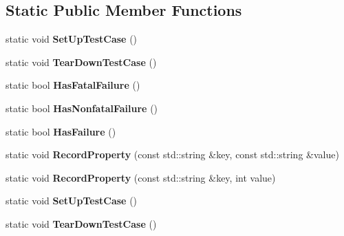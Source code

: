 \subsection*{Static Public Member Functions}
\begin{DoxyCompactItemize}
\item 
\hypertarget{classtesting_1_1_test_a5ccbac42fee8c5b00b0bfe89b6c49d79}{}static void {\bfseries Set\+Up\+Test\+Case} ()\label{classtesting_1_1_test_a5ccbac42fee8c5b00b0bfe89b6c49d79}

\item 
\hypertarget{classtesting_1_1_test_af374706cbaf0ffc460f4fd04e7c150f1}{}static void {\bfseries Tear\+Down\+Test\+Case} ()\label{classtesting_1_1_test_af374706cbaf0ffc460f4fd04e7c150f1}

\item 
\hypertarget{classtesting_1_1_test_a0a89846458f0e8ed1c9457c957e8182a}{}static bool {\bfseries Has\+Fatal\+Failure} ()\label{classtesting_1_1_test_a0a89846458f0e8ed1c9457c957e8182a}

\item 
\hypertarget{classtesting_1_1_test_a07e896f1b1836f8ac075c26d7b7c9fb8}{}static bool {\bfseries Has\+Nonfatal\+Failure} ()\label{classtesting_1_1_test_a07e896f1b1836f8ac075c26d7b7c9fb8}

\item 
\hypertarget{classtesting_1_1_test_a7a00be7dd0a6bfdc8d47a1b784623613}{}static bool {\bfseries Has\+Failure} ()\label{classtesting_1_1_test_a7a00be7dd0a6bfdc8d47a1b784623613}

\item 
\hypertarget{classtesting_1_1_test_ae0448aec9e389fab70f6a75a59ff6aa2}{}static void {\bfseries Record\+Property} (const std\+::string \&key, const std\+::string \&value)\label{classtesting_1_1_test_ae0448aec9e389fab70f6a75a59ff6aa2}

\item 
\hypertarget{classtesting_1_1_test_af602903efb17730b977304fc56500881}{}static void {\bfseries Record\+Property} (const std\+::string \&key, int value)\label{classtesting_1_1_test_af602903efb17730b977304fc56500881}

\item 
\hypertarget{classtesting_1_1_test_a5ccbac42fee8c5b00b0bfe89b6c49d79}{}static void {\bfseries Set\+Up\+Test\+Case} ()\label{classtesting_1_1_test_a5ccbac42fee8c5b00b0bfe89b6c49d79}

\item 
\hypertarget{classtesting_1_1_test_af374706cbaf0ffc460f4fd04e7c150f1}{}static void {\bfseries Tear\+Down\+Test\+Case} ()\label{classtesting_1_1_test_af374706cbaf0ffc460f4fd04e7c150f1}


\end{DoxyCompactItemize}
